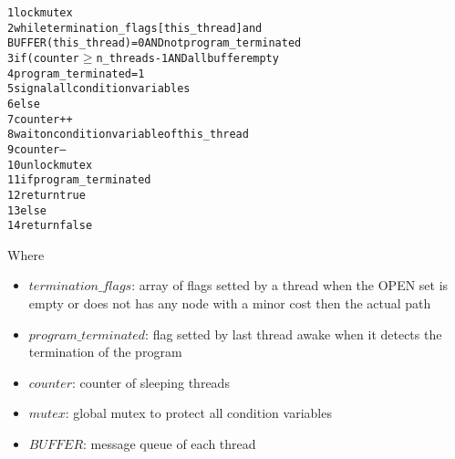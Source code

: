 \begin{alltt}
    1 lock mutex
    2 while termination_flags[this_thread] and
    BUFFER(this_thread) = 0 AND not program_terminated
    3   if(counter \( \geq \) n_threads - 1 AND all buffer empty
    4       program_terminated = 1
    5       signal all condition variables
    6   else
    7       counter++
    8       wait on condition variable of this_thread
    9       counter--
    10 unlock mutex
    11 if program_terminated
    12   return true
    13 else
    14   return false
\end{alltt}

Where
\begin{itemize}
    \item $termination\_flags$: array of flags setted by a thread when the OPEN set is empty or does not has any node with a minor cost then the actual path
    \item $program\_terminated$: flag setted by last thread awake when it detects the termination of the program
    \item $counter$: counter of sleeping threads
    \item $mutex$: global mutex to protect all condition variables
    \item $BUFFER$: message queue of each thread
\end{itemize}

